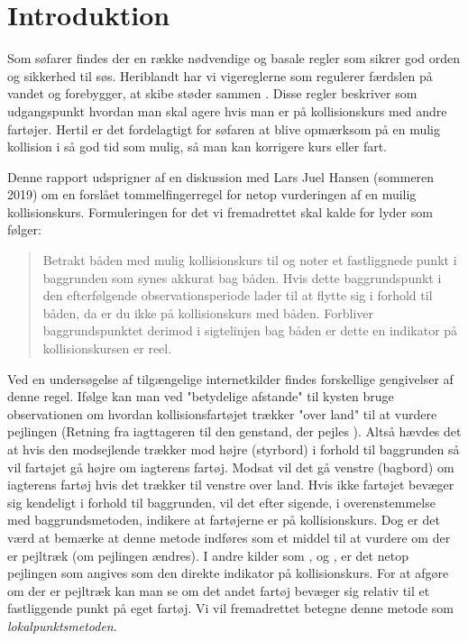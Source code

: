 \documentclass[%
 reprint,
nofootinbib,
aps,
]{revtex4-1}
\begin{document}
\section{Introduktion}
Som søfarer findes der en række nødvendige og basale regler som sikrer god orden og sikkerhed til søs. Heriblandt har vi vigereglerne som regulerer færdslen på vandet og forebygger, at skibe støder sammen \cite{respektforvand}. Disse regler beskriver som udgangspunkt hvordan man skal agere hvis man er på kollisionskurs med andre fartøjer. Hertil er det fordelagtigt for søfaren at blive opmærksom på en mulig kollision i så god tid som mulig, så man kan korrigere kurs eller fart. \par
Denne rapport udsprigner af en diskussion med Lars Juel Hansen (sommeren 2019) om en forslået tommelfingerregel for netop vurderingen af en muilig kollisionskurs. Formuleringen for det vi fremadrettet skal kalde for  lyder som følger:
\begin{quote}
Betrakt båden med mulig kollisionskurs til og noter et fastliggnede punkt i baggrunden som synes akkurat bag båden. Hvis dette baggrundspunkt i den efterfølgende observationsperiode lader til at flytte sig i forhold til båden, da er du ikke på kollisionskurs med båden. Forbliver baggrundspunktet derimod i sigtelinjen bag båden er dette en indikator på kollisionskursen er reel.
\end{quote}
Ved en undersøgelse af tilgængelige internetkilder findes forskellige gengivelser af denne regel. Ifølge \cite{duelighed} kan man ved "betydelige afstande" til kysten bruge observationen om hvordan kollisionsfartøjet trækker "over land" til at vurdere pejlingen (Retning fra iagttageren til den genstand, der pejles \cite{ordbog}). Altså hævdes det at hvis den modsejlende trækker mod højre (styrbord) i forhold til baggrunden så vil fartøjet gå højre om iagterens fartøj. Modsat vil det gå venstre (bagbord) om iagterens fartøj hvis det trækker til venstre over land. Hvis ikke fartøjet bevæger sig kendeligt i forhold til baggrunden, vil det efter sigende, i overenstemmelse med baggrundsmetoden, indikere at fartøjerne er på kollisionskurs. Dog er det værd at bemærke at denne metode indføres som et middel til at vurdere om der er pejltræk (om pejlingen ændres). I andre kilder som \cite{studienoter}, \cite{retsinformation} og \cite{groensund}, er det netop pejlingen som angives som den direkte indikator på kollisionskurs. For at afgøre om der er pejltræk kan man se om det andet fartøj bevæger sig relativ til et fastliggende punkt på eget fartøj. Vi vil fremadrettet betegne denne metode som \textit{lokalpunktsmetoden}. \par
\end{document}
